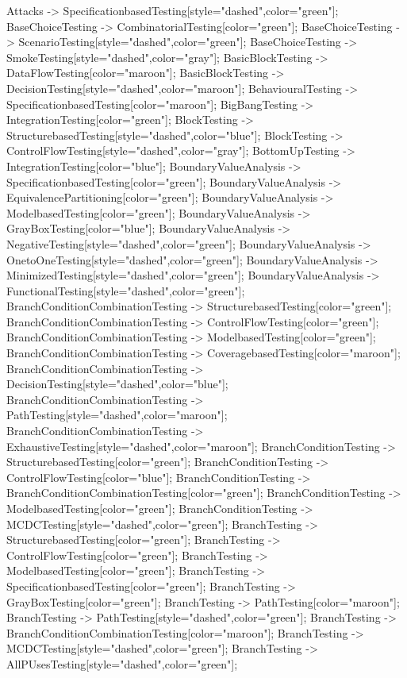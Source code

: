 \documentclass{article}
\begin{document}
{Attacks -> SpecificationbasedTesting[style="dashed",color="green"];
BaseChoiceTesting -> CombinatorialTesting[color="green"];
BaseChoiceTesting -> ScenarioTesting[style="dashed",color="green"];
BaseChoiceTesting -> SmokeTesting[style="dashed",color="gray"];
BasicBlockTesting -> DataFlowTesting[color="maroon"];
BasicBlockTesting -> DecisionTesting[style="dashed",color="maroon"];
BehaviouralTesting -> SpecificationbasedTesting[color="maroon"];
BigBangTesting -> IntegrationTesting[color="green"];
BlockTesting -> StructurebasedTesting[style="dashed",color="blue"];
BlockTesting -> ControlFlowTesting[style="dashed",color="gray"];
BottomUpTesting -> IntegrationTesting[color="blue"];
BoundaryValueAnalysis -> SpecificationbasedTesting[color="green"];
BoundaryValueAnalysis -> EquivalencePartitioning[color="green"];
BoundaryValueAnalysis -> ModelbasedTesting[color="green"];
BoundaryValueAnalysis -> GrayBoxTesting[color="blue"];
BoundaryValueAnalysis -> NegativeTesting[style="dashed",color="green"];
BoundaryValueAnalysis -> OnetoOneTesting[style="dashed",color="green"];
BoundaryValueAnalysis -> MinimizedTesting[style="dashed",color="green"];
BoundaryValueAnalysis -> FunctionalTesting[style="dashed",color="green"];
BranchConditionCombinationTesting -> StructurebasedTesting[color="green"];
BranchConditionCombinationTesting -> ControlFlowTesting[color="green"];
BranchConditionCombinationTesting -> ModelbasedTesting[color="green"];
BranchConditionCombinationTesting -> CoveragebasedTesting[color="maroon"];
BranchConditionCombinationTesting -> DecisionTesting[style="dashed",color="blue"];
BranchConditionCombinationTesting -> PathTesting[style="dashed",color="maroon"];
BranchConditionCombinationTesting -> ExhaustiveTesting[style="dashed",color="maroon"];
BranchConditionTesting -> StructurebasedTesting[color="green"];
BranchConditionTesting -> ControlFlowTesting[color="blue"];
BranchConditionTesting -> BranchConditionCombinationTesting[color="green"];
BranchConditionTesting -> ModelbasedTesting[color="green"];
BranchConditionTesting -> MCDCTesting[style="dashed",color="green"];
BranchTesting -> StructurebasedTesting[color="green"];
BranchTesting -> ControlFlowTesting[color="green"];
BranchTesting -> ModelbasedTesting[color="green"];
BranchTesting -> SpecificationbasedTesting[color="green"];
BranchTesting -> GrayBoxTesting[color="green"];
BranchTesting -> PathTesting[color="maroon"];
BranchTesting -> PathTesting[style="dashed",color="green"];
BranchTesting -> BranchConditionCombinationTesting[color="maroon"];
BranchTesting -> MCDCTesting[style="dashed",color="green"];
BranchTesting -> AllPUsesTesting[style="dashed",color="green"];
}
\end{document}
